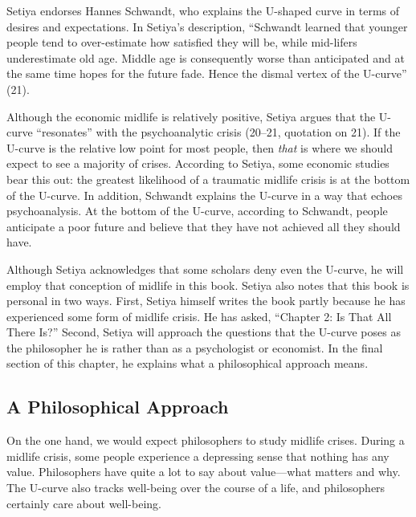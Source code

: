 \documentclass[12pt,letterpaper]{article}
\begin{document}
Setiya endorses Hannes Schwandt, who explains the U-shaped curve in terms of desires and expectations.
In Setiya's description,
``Schwandt learned that younger people tend to over-estimate how satisfied they will be, while mid-lifers underestimate old age.
Middle age is consequently worse than anticipated and at the same time hopes for the future fade.
Hence the dismal vertex of the U-curve'' (21).

Although the economic midlife is relatively positive, Setiya argues that the U-curve ``resonates'' with the psychoanalytic crisis (20--21, quotation on 21).
If the U-curve is the relative low point for most people, then \textit{that} is where we should expect to see a majority of crises.
According to Setiya, some economic studies bear this out: the greatest likelihood of a traumatic midlife crisis is at the bottom of the U-curve.
In addition, Schwandt explains the U-curve in a way that echoes psychoanalysis.
At the bottom of the U-curve, according to Schwandt, people anticipate a poor future and believe that they have not achieved all they should have.

Although Setiya acknowledges that some scholars deny even the U-curve, he will employ that conception of midlife in this book.
Setiya also notes that this book is personal in two ways.
First, Setiya himself writes the book partly because he has experienced some form of midlife crisis.
He has asked, ``Chapter 2: Is That All There Is?''
Second, Setiya will approach the questions that the U-curve poses as the philosopher he is rather than as a psychologist or economist.
In the final section of this chapter, he explains what a philosophical approach means.

\subsection*{A Philosophical Approach}

On the one hand, we would expect philosophers to study midlife crises.
During a midlife crisis, some people experience a depressing sense that nothing has any value.
Philosophers have quite a lot to say about value---what matters and why.
The U-curve also tracks well-being over the course of a life, and philosophers certainly care about well-being.
\end{document}
